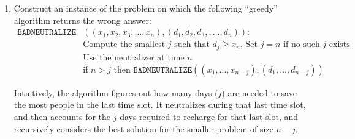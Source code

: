 \documentclass[10pt]{article}
\begin{document}
\begin{enumerate}
    \item Construct an instance of the problem on which the following ``greedy'' algorithm returns the wrong answer:
    \begin{align*}
        \mathtt{BADNEUTRALIZE}&((x_1, x_2, x_3, \ldots , x_n), (d_1, d_2, d_3, , \ldots, d_n)): \\
        & \text{Compute the smallest $j$ such that $d_j \geq  x_n$, Set $j = n$ if no such $j$ exists} \\
        & \text{Use the neutralizer at time $n$}\\
        & \text{if $n > j$ then $\mathtt{BADNEUTRALIZE}((x_1, \ldots , x_{n - j}), (d_1, . . . , d_{n-j}))$}
    \end{align*}
    
    Intuitively, the algorithm figures out how many days ($j$) are needed to save the most people in the last time slot. It neutralizes during that last time slot, and then accounts for the $j$ days required to recharge for that last slot, and recursively considers the best solution for the smaller problem of size $n-j$.
    

\end{enumerate}
\end{document}
